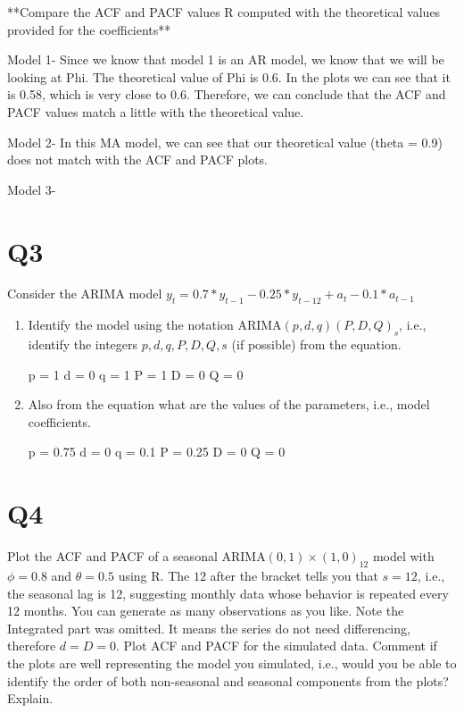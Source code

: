 \documentclass[
]{article}
\begin{document}
\begin{enumerate}[label=(\alph*)]
**Compare the ACF and PACF values R computed with the theoretical values provided for the coefficients**

\medskip

Model 1- Since we know that model 1 is an AR model, we know that we will be looking at Phi. The theoretical value of Phi is 0.6. In the plots we can see that it is 0.58, which is very close to 0.6. Therefore, we can conclude that the ACF and PACF values match a little with the theoretical value.

Model 2- In this MA model, we can see that our theoretical value (theta = 0.9) does not match with the ACF and PACF plots.

Model 3- 


\end{enumerate}

\hypertarget{q3}{%
\section{Q3}\label{q3}}

Consider the ARIMA model
\(y_t=0.7*y_{t-1}-0.25*y_{t-12}+a_t-0.1*a_{t-1}\)

\begin{enumerate}[label=(\alph*)]

\item Identify the model using the notation ARIMA$(p,d,q)(P,D,Q)_ s$, i.e., identify the integers $p,d,q,P,D,Q,s$ (if possible) from the equation.

p = 1
d = 0
q = 1
P = 1
D = 0
Q = 0

\item Also from the equation what are the values of the parameters, i.e., model coefficients. 

p = 0.75
d = 0
q = 0.1
P = 0.25
D = 0
Q = 0

\end{enumerate}

\hypertarget{q4}{%
\section{Q4}\label{q4}}

Plot the ACF and PACF of a seasonal ARIMA\((0, 1)\times(1, 0)_{12}\)
model with \(\phi =0 .8\) and \(\theta = 0.5\) using R. The \(12\) after
the bracket tells you that \(s=12\), i.e., the seasonal lag is 12,
suggesting monthly data whose behavior is repeated every 12 months. You
can generate as many observations as you like. Note the Integrated part
was omitted. It means the series do not need differencing, therefore
\(d=D=0\). Plot ACF and PACF for the simulated data. Comment if the
plots are well representing the model you simulated, i.e., would you be
able to identify the order of both non-seasonal and seasonal components
from the plots? Explain.
\end{document}
